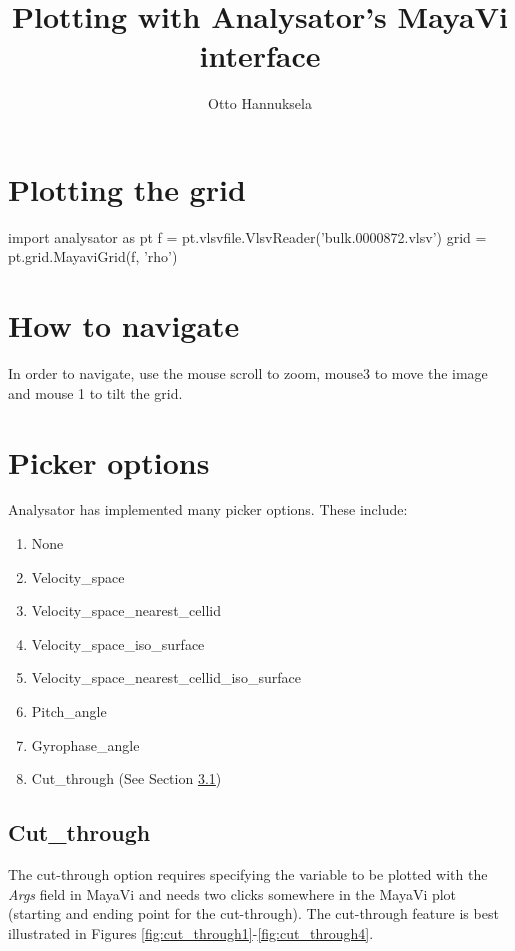 \documentclass[a4paper,10pt]{article}
\title{Plotting with Analysator's MayaVi interface}
\author{Otto Hannuksela}
\begin{document}
\maketitle

\tableofcontents

\newpage

\section{Plotting the grid}

\begin{python}
import analysator as pt
f = pt.vlsvfile.VlsvReader('bulk.0000872.vlsv')
grid = pt.grid.MayaviGrid(f, 'rho')
\end{python}

\section{How to navigate}

In order to navigate, use the mouse scroll to zoom, mouse3 to move the image and mouse 1 to tilt the 
grid.

\section{Picker options}

Analysator has implemented many picker options. These include:

\begin{enumerate}
 \item None
 \item Velocity\_space
 \item Velocity\_space\_nearest\_cellid
 \item Velocity\_space\_iso\_surface
 \item Velocity\_space\_nearest\_cellid\_iso\_surface
 \item Pitch\_angle
 \item Gyrophase\_angle
 \item Cut\_through (See Section \ref{ssec:cutthrough})
\end{enumerate}

\newpage

\subsection{Cut\_through} \label{ssec:cutthrough}

The cut-through option requires specifying the variable to be plotted with the \emph{Args} field in 
MayaVi and needs two clicks somewhere in the MayaVi plot (starting and ending point for the cut-through). 
The cut-through feature is best illustrated in Figures \ref{fig:cut_through1}-\ref{fig:cut_through4}.
\end{document}
